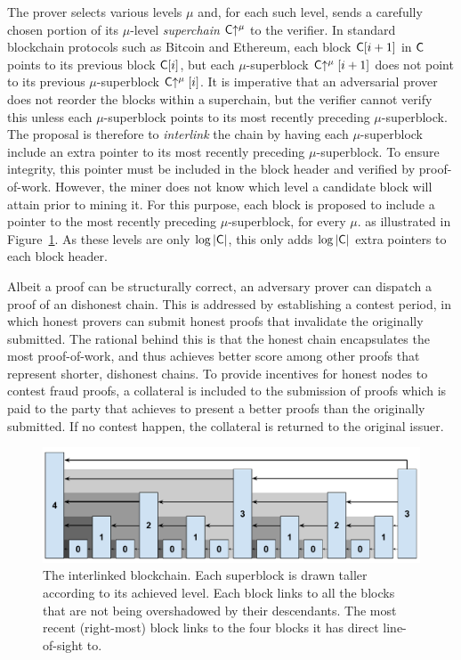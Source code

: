 The prover selects various levels $\mu$ and, for each
such level, sends a carefully chosen portion of its $\mu$-level
\emph{superchain} $\mathsf{C}\negthickspace\uparrow^\mu$ to the verifier. In standard blockchain
protocols such as Bitcoin and Ethereum, each block $\mathsf{C}[i + 1]$ in $\mathsf{C}$
points to its previous block $\mathsf{C}[i]$, but each $\mu$-superblock
$\mathsf{C}\negthickspace\uparrow^\mu[i + 1]$ does not point to its previous $\mu$-superblock
$\mathsf{C}\negthickspace\uparrow^\mu[i]$. It is imperative that an adversarial prover does not
reorder the blocks within a superchain, but the verifier cannot verify this
unless each $\mu$-superblock points to its most recently preceding
$\mu$-superblock. The proposal is therefore to \emph{interlink} the chain by
having each $\mu$-superblock include an extra pointer to its most recently
preceding $\mu$-superblock. To ensure integrity, this pointer must be included
in the block header and verified by proof-of-work. However, the miner does not
know which level a candidate block will attain prior to mining it. For this
purpose, each block is proposed to include a pointer to the most recently
preceding $\mu$-superblock, for every $\mu$.
as illustrated in Figure~\ref{fig.hierarchy}.
As these levels are only $\log|\mathsf{C}|$, this only adds $\log|\mathsf{C}|$ extra
pointers to each block header.

Albeit a proof can be structurally correct, an adversary prover can dispatch a
proof of an dishonest chain. This is addressed by establishing a contest
period, in which honest provers can submit honest proofs that invalidate
the originally submitted. The rational behind this is that the honest chain
encapsulates the most proof-of-work, and thus achieves better score among
other proofs that represent shorter, dishonest chains. To provide incentives for honest
nodes to contest fraud proofs, a collateral is included to the submission of
proofs which is paid to the party that achieves to present a better proofs than
the originally submitted. If no contest happen, the collateral is returned to
the original issuer.


\begin{figure}[ht]
    \centering
    \includegraphics[width=0.9\columnwidth,keepaspectratio]{figures/prelims/level-shadows.pdf}
    \caption{The interlinked blockchain. Each superblock is drawn taller
    according to its achieved level. Each block links to all the blocks that are
    not being overshadowed by their descendants. The most recent (right-most)
    block links to the four blocks it has direct line-of-sight to.}
    \label{fig.hierarchy}
\end{figure}

